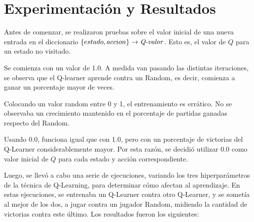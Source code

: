 \section{Experimentación y Resultados}
Antes de comenzar, se realizaron pruebas sobre el valor inicial de una nueva entrada en el diccionario $\{estado, accion\} \rightarrow \text{\emph{Q-valor}}$. Esto es, el valor de $Q$ para un estado no visitado.

Se comienza con un valor de 1.0. A medida van pasando las distintas iteraciones, se observa que el Q-learner aprende contra un Random, es decir, comienza a ganar un porcentaje mayor de veces.

Colocando un valor random entre 0 y 1, el entrenamiento es errático. No se observaba un crecimiento mantenido en el porcentaje de partidas ganadas respecto del Random.

Usando 0.0, funciona igual que con 1.0, pero con un porcentaje de victorias del Q-Learner considerablemente mayor.
Por esta raz\'on, se decidi\'o utilizar 0.0 como valor inicial de $Q$ para cada estado y acci\'on correspondiente.

Luego, se llev\'o a cabo una serie de ejecuciones, variando los tres hiperpar\'ametros de la t\'ecnica de Q-Learning, para determinar c\'omo afectan al aprendizaje.
En estas ejecuciones, se entrenaba un Q-Learner contra otro Q-Learner, y se somet\'ia al mejor de los dos, a jugar contra un jugador Random, midiendo la cantidad de victorias contra este \'ultimo. Los resultados fueron los siguientes:


